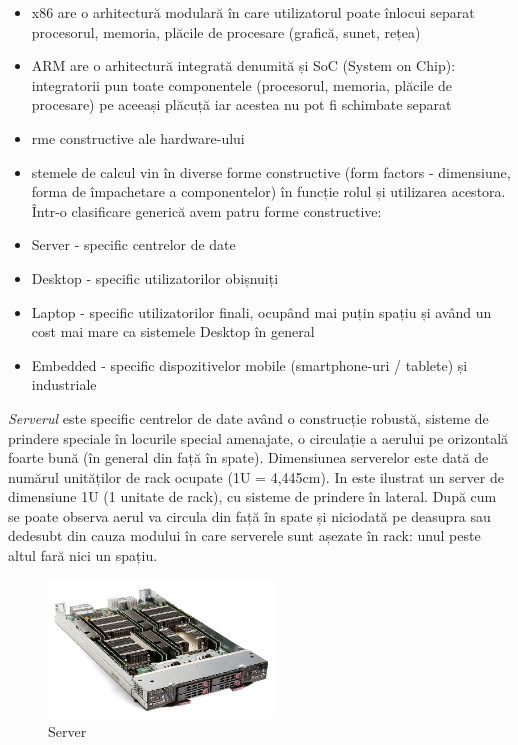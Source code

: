 \begin{itemize}
	\item x86 are o arhitectură modulară în care utilizatorul poate înlocui
		separat procesorul, memoria, plăcile de procesare (grafică,
		sunet, rețea)
	\item ARM are o arhitectură integrată denumită și SoC (System on Chip):
		integratorii pun toate componentele (procesorul, memoria,
		plăcile de procesare) pe aceeași plăcuță iar acestea nu pot fi
		schimbate separat
	\item rme constructive ale hardware-ului
	\item stemele de calcul vin în diverse forme constructive (form factors
		- dimensiune, forma de împachetare a componentelor) în funcție
		rolul și utilizarea acestora. Într-o clasificare generică avem
		patru forme constructive:
	\item Server - specific centrelor de date
	\item Desktop - specific utilizatorilor obișnuiți
	\item Laptop - specific utilizatorilor finali, ocupând mai puțin spațiu
		și având un cost mai mare ca sistemele Desktop în general
	\item Embedded - specific dispozitivelor mobile (smartphone-uri /
		tablete) și industriale
\end{itemize}

\textit{Serverul} este specific centrelor de date având o construcție robustă,
sisteme de prindere speciale în locurile special amenajate, o circulație a
aerului pe orizontală foarte bună (în general din față în spate). Dimensiunea
serverelor este dată de numărul unităților de rack ocupate (1U = 4,445cm). In
 este ilustrat un server de dimensiune 1U
(1 unitate de rack), cu sisteme de prindere în lateral. După cum se poate
observa aerul va circula din față în spate și niciodată pe deasupra sau dedesubt
din cauza modului în care serverele sunt așezate în rack: unul peste altul fară
nici un spațiu.

\begin{figure}[!htbp]
	\centering
	\includegraphics[width=6cm]{chapters/08-hw/img/server-img.png}
	\caption{Server\protect\footnotemark}
	\label{fig:hw-server}
\end{figure}

